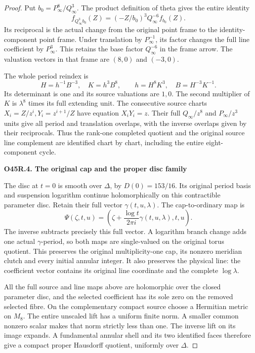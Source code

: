 \begin{proof}
Put \(b_0=P_\infty^8/Q_\infty^3\).
The product definition of theta gives
the entire identity
\[
 f_{Q_\infty^3b_0}(Z)=
       (-Z/b_0)^3Q_\infty^{-6}f_{b_0}(Z).
 \tag{O45R.30}
\]
Its reciprocal is the actual change
from the original point frame to the
identity-component point frame. Under
translation by \(P_\infty^{-1}\), its
factor changes the full line coefficient
by \(P_\infty^3\). This retains the
base factor \(Q_\infty^{-6}\) in the
frame arrow. The valuation vectors
in that frame are \((8,0)\) and
\((-3,0)\).

The whole period reindex is
\[
 H=h^{-1}B^{-3},\quad K=h^3B^8,\qquad
 h=H^8K^3,\quad B=H^{-3}K^{-1}.
 \tag{O45R.31}
\]
Its determinant is one and its
source valuations are \(1,0\).
The second multiplier of \(K\)
is \(\lambda^8\) times its full
extending unit. The consecutive
source charts
\(X_i=Z/z^i,Y_i=z^{i+1}/Z\)
have equation \(X_iY_i=z\).
Their full \(Q_\infty/z^8\) and
\(P_\infty/z^3\) units give all
period and translation overlaps,
with the inverse overlaps given
by their reciprocals. Thus the
rank-one completed quotient and
the original source line
complement are identified chart
by chart, including the entire
eight-component cycle.

\par

\medskip\noindent\textbf{O45R.4. The original cap and the proper disc family}

\par\nobreak

The disc at \(t=0\) is smooth over
\(\Delta\), by \(D(0)=153/16\).
Its original period basis and
suspension logarithm continue
holomorphically on this
contractible parameter disc.
Retain their full vector
\(\gamma(t,u,\lambda)\).
The cap-to-ordinary map is
\[
 \Psi(\zeta,t,u)=
  \left(\zeta+\frac{\log t}{2\pi i}
           \gamma(t,u,\lambda),t,u\right).
 \tag{O45R.32}
\]
The inverse subtracts precisely
this full vector. A logarithm
branch change adds one actual
\(\gamma\)-period, so both maps
are single-valued on the
original torus quotient. This
preserves the original
multiplicity-one cap, its
nonzero meridian clutch and
every initial annular integer.
It also preserves the
physical line: the
coefficient vector contains
its original line coordinate
and the complete
\(\log\lambda\).

All the full source and line
maps above are holomorphic
over the closed parameter
disc, and the selected
coefficient has its sole
zero on the removed selected
fibre. On the complementary
compact source choose a
Hermitian metric on \(M_8\).
The entire unscaled lift has
a uniform finite norm.
A smaller common nonzero
scalar makes that norm
strictly less than one.
The inverse lift on its
image expands. A fundamental
annular shell and its two
identified faces therefore
give a compact proper
Hausdorff quotient, uniformly
over \(\Delta\).


\end{proof}
